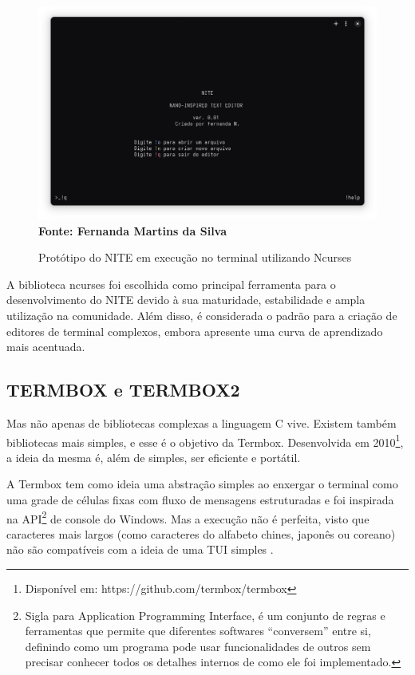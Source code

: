 \FloatBarrier
\begin{figure}[!htbp]
    \centering
    \caption{Protótipo do NITE em execução no terminal utilizando Ncurses}
    \includegraphics[scale=0.3]{imagens/NITE.png}
    \\\textbf{Fonte: Fernanda Martins da Silva} \label{fig:NITE}
\end{figure}
\FloatBarrier

A biblioteca ncurses foi escolhida como principal ferramenta para o desenvolvimento
do NITE devido à sua maturidade, estabilidade e ampla utilização na comunidade. Além
disso, é considerada o padrão para a criação de editores de terminal complexos, embora
apresente uma curva de aprendizado mais acentuada.

\subsection{TERMBOX e TERMBOX2}

Mas não apenas de bibliotecas complexas a linguagem C vive. Existem também bibliotecas
mais simples, e esse é o objetivo da Termbox. Desenvolvida em 2010\footnote{Disponível
em: https://github.com/termbox/termbox}, a ideia da mesma é, além de simples, ser
eficiente e portátil.

A Termbox tem como ideia uma abstração simples ao enxergar o terminal como uma grade
de células fixas com fluxo de mensagens estruturadas e foi inspirada na API\footnote{Sigla
para Application Programming Interface, é um conjunto de regras e ferramentas que
permite que diferentes softwares “conversem” entre si, definindo como um
programa pode usar funcionalidades de outros sem precisar conhecer todos os
detalhes internos de como ele foi implementado.} de console do Windows. Mas a execução
não é perfeita, visto que caracteres mais largos (como caracteres do alfabeto chines,
japonês ou coreano) não são compatíveis com a ideia de uma TUI simples \cite{termbox_googlecode}.

